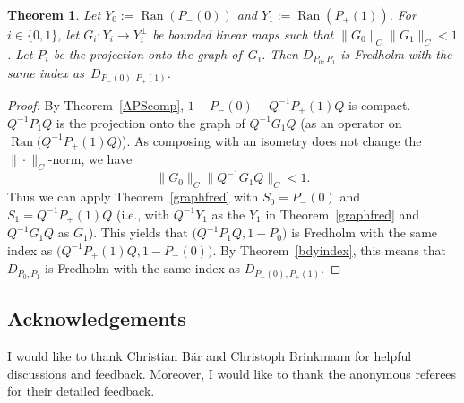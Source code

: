 \documentclass[pdftex]{sigma}
\numberwithin{equation}{section}
\newtheorem{Theorem}{Theorem}[section]
\DeclareMathOperator{\Ran}{Ran}
\begin{document}
	\begin{Theorem}
		\label{finalgraph}
		Let $Y_0:=\Ran(P_-(0))$ and $Y_1:=\Ran(P_+(1))$. For $i\in \{0,1\}$, let
		$G_i\colon Y_i\rightarrow Y_i^\bot$
		be bounded linear maps such that
		$\|G_0\|_C\|G_1\|_C<1$.
		Let $P_i$ be the projection onto the graph of~$G_i$.
		Then $D_{P_0,P_1}$ is Fredholm with the same index as~$D_{P_-(0),P_+(1)}$.
	\end{Theorem}
	\begin{proof}
By Theorem~\ref{APScomp}, $1-P_-(0)-Q^{-1}P_+(1)Q$ is compact. $Q^{-1}P_1Q$ is the projection onto the graph of $Q^{-1}G_1Q$ \big(as an operator on $\Ran\bigl(Q^{-1}P_+(1)Q\bigr)$\big). As composing with an isometry does not change the  $\|\cdot\|_C$-norm, we have
		\[\|G_0\|_C\bigl\|Q^{-1}G_1Q\bigr\|_C<1.\]
		Thus we can apply Theorem~\ref{graphfred} with $S_0=P_-(0)$ and $S_1=Q^{-1}P_+(1)Q$ \big(i.e., with $Q^{-1}Y_1$ as the $Y_1$ in Theorem~\ref{graphfred} and $Q^{-1}G_1Q$ as $G_1$\big). This yields that $\bigl(Q^{-1}P_1Q,1-P_0\bigr)$ is Fredholm with the same index as $\bigl(Q^{-1}P_+(1)Q,1-P_-(0)\bigr)$. By Theorem~\ref{bdyindex}, this means that $D_{P_0,P_1}$ is Fredholm with the same index as $D_{P_-(0),P_+(1)}$.
	\end{proof}

\subsection*{Acknowledgements}
I would like to thank Christian B\"ar and Christoph Brinkmann for helpful discussions and feedback. Moreover, I would like to thank the anonymous referees for their detailed feedback.
\end{document}
